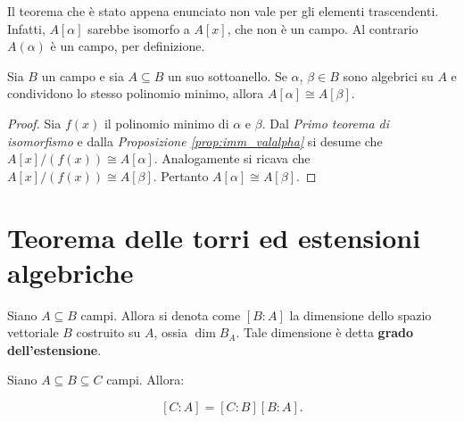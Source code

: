 \documentclass[11pt]{scrbook}
\begin{document}
\begin{remark*}
    Il teorema che è stato appena enunciato non vale per
    gli elementi trascendenti. Infatti, $A[\alpha]$ sarebbe
    isomorfo a $A[x]$, che non è un campo. Al contrario
    $A(\alpha)$ è un campo, per definizione.
\end{remark*}

\begin{proposition}
    Sia $B$ un campo e sia $A \subseteq B$ un suo sottoanello.
    Se $\alpha$, $\beta \in B$ sono algebrici su $A$ e condividono
    lo stesso polinomio minimo, allora $A[\alpha] \cong A[\beta]$.
\end{proposition}

\begin{proof}
    Sia $f(x)$ il polinomio minimo di $\alpha$ e $\beta$.
    Dal \textit{Primo teorema di isomorfismo} e dalla
    \textit{Proposizione \ref{prop:imm_valalpha}} si
    desume che $A[x]/(f(x)) \cong A[\alpha]$. Analogamente
    si ricava che $A[x]/(f(x)) \cong A[\beta]$. Pertanto
    $A[\alpha] \cong A[\beta]$.
\end{proof}

\section{Teorema delle torri ed estensioni algebriche}

\begin{definition}
    Siano $A \subseteq B$ campi. Allora si denota come
    $[B : A]$ la dimensione dello spazio vettoriale $B$
    costruito su $A$, ossia $\dim B_A$. Tale dimensione è detta \textbf{grado
        dell'estensione}.
\end{definition}

\begin{theorem}
    \label{th:torri}
    Siano $A \subseteq B \subseteq C$ campi. Allora:

    \[ [C : A] = [C : B] [B : A]. \]
    \vskip 0.1in
\end{theorem}
\end{document}
